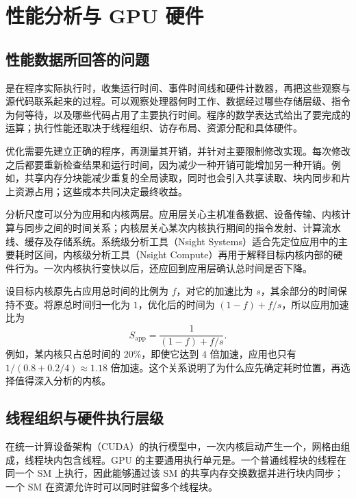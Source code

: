\section{性能分析与 GPU 硬件}
\label{l14:sec:hardware}

\subsection{性能数据所回答的问题}

是在程序实际执行时，收集运行时间、事件时间线和硬件计数器，再把这些观察与源代码联系起来的过程。可以观察处理器何时工作、数据经过哪些存储层级、指令为何等待，以及哪些代码占用了主要执行时间。程序的数学表达式给出了要完成的运算；执行性能还取决于线程组织、访存布局、资源分配和具体硬件。

优化需要先建立正确的程序，再测量其开销，并针对主要限制修改实现。每次修改之后都要重新检查结果和运行时间，因为减少一种开销可能增加另一种开销。例如，共享内存分块能减少重复的全局读取，同时也会引入共享读取、块内同步和片上资源占用；这些成本共同决定最终收益。

分析尺度可以分为应用和内核两层。应用层关心主机准备数据、设备传输、内核计算与同步之间的时间关系；内核层关心某次内核执行期间的指令发射、计算流水线、缓存及存储系统。系统级分析工具（Nsight Systems）适合先定位应用中的主要耗时区间，内核级分析工具（Nsight Compute）再用于解释目标内核内部的硬件行为。一次内核执行变快以后，还应回到应用层确认总时间是否下降。

设目标内核原先占应用总时间的比例为 $f$，对它的加速比为 $s$，其余部分的时间保持不变。将原总时间归一化为 $1$，优化后的时间为 $(1-f)+f/s$，所以应用加速比为
\begin{equation}
  S_{\mathrm{app}}=\frac{1}{(1-f)+f/s}.
  \label{l14:eq:amdahl}
\end{equation}
例如，某内核只占总时间的 $20\%$，即使它达到 $4$ 倍加速，应用也只有 $1/(0.8+0.2/4)\approx1.18$ 倍加速。这个关系说明了为什么应先确定耗时位置，再选择值得深入分析的内核。

\subsection{线程组织与硬件执行层级}

在统一计算设备架构（CUDA）的执行模型中，一次内核启动产生一个，网格由组成，线程块内包含线程。GPU 的主要通用执行单元是。一个普通线程块的线程在同一个 SM 上执行，因此能够通过该 SM 的共享内存交换数据并进行块内同步；一个 SM 在资源允许时可以同时驻留多个线程块。

